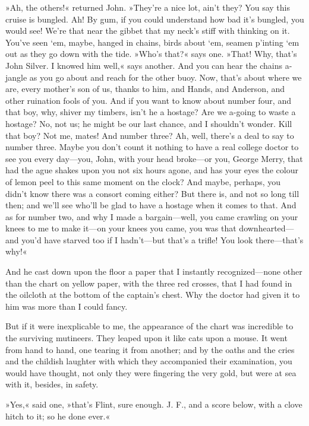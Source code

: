 »Ah, the others!« returned John. »They're a nice lot, ain't they? You say this cruise is bungled. Ah! By gum, if you could understand how bad it's bungled, you would see! We're that near the gibbet that my neck's stiff with thinking on it. You've seen `em, maybe, hanged in chains, birds about `em, seamen p'inting `em out as they go down with the tide. »Who's that?« says one. »That! Why, that's John Silver. I knowed him well,« says another. And you can hear the chains a-jangle as you go about and reach for the other buoy. Now, that's about where we are, every mother's son of us, thanks to him, and Hands, and Anderson, and other ruination fools of you. And if you want to know about number four, and that boy, why, shiver my timbers, isn't he a hostage? Are we a-going to waste a hostage? No, not us; he might be our last chance, and I shouldn't wonder. Kill that boy? Not me, mates! And number three? Ah, well, there's a deal to say to number three. Maybe you don't count it nothing to have a real college doctor to see you every day—you, John, with your head broke—or you, George Merry, that had the ague shakes upon you not six hours agone, and has your eyes the colour of lemon peel to this same moment on the clock? And maybe, perhaps, you didn't know there was a consort coming either? But there is, and not so long till then; and we'll see who'll be glad to have a hostage when it comes to that. And as for number two, and why I made a bargain—well, you came crawling on your knees to me to make it—on your knees you came, you was that downhearted—and you'd have starved too if I hadn't—but that's a trifle! You look there—that's why!«

And he cast down upon the floor a paper that I instantly recognized—none other than the chart on yellow paper, with the three red crosses, that I had found in the oilcloth at the bottom of the captain's chest. Why the doctor had given it to him was more than I could fancy.

But if it were inexplicable to me, the appearance of the chart was incredible to the surviving mutineers. They leaped upon it like cats upon a mouse. It went from hand to hand, one tearing it from another; and by the oaths and the cries and the childish laughter with which they accompanied their examination, you would have thought, not only they were fingering the very gold, but were at sea with it, besides, in safety.

»Yes,« said one, »that's Flint, sure enough. J. F., and a score below, with a clove hitch to it; so he done ever.«

